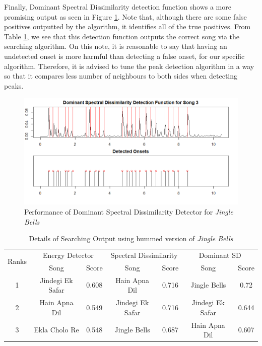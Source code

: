 \documentclass[10pt]{article}
\begin{document}
Finally, Dominant Spectral Dissimilarity detection function shows a more promising output as seen in Figure \ref{fig:dfreq_song3}. Note that, although there are some false positives outputted by the algorithm, it identifies all of the true positives. From Table \ref{tbl:search_song3}, we see that this detection function outputs the correct song via the searching algorithm. On this note, it is reasonable to say that having an undetected onset is more harmful than detecting a false onset, for our specific algorithm. Therefore, it is advised to tune the peak detection algorithm in a way so that it compares less number of neighbours to both sides when detecting peaks.

\begin{figure}
    \centering
    \includegraphics[width = \textwidth]{dfreq_song3.png}
    \caption{Performance of Dominant Spectral Dissimilarity Detector for \textit{Jingle Bells}}
    \label{fig:dfreq_song3}
\end{figure}

\begin{table}
\centering
\caption{Details of Searching Output using hummed version of \textit{Jingle Bells}}
\label{tbl:search_song3}
\begin{tabular}{|c|c|c|c|c|c|c|}
\hline
\multirow{2}{*}{Ranks} & \multicolumn{2}{c|}{Energy Detector} & \multicolumn{2}{c|}{Spectral Dissimilarity} & \multicolumn{2}{c|}{Dominant SD} \\ \cline{2-7} 
    & Song                  & Score        & Song                      & Score           & Song                   & Score     \\ \hline
1   & Jindegi Ek Safar  & 0.608  & Hain Apna Dil & 0.716  &  Jingle Bells    & 0.72     \\ \hline
2       & Hain Apna Dil         & 0.549        & Jindegi Ek Safar             & 0.716           & Jindegi Ek Safar         & 0.644     \\ \hline
3   &   Ekla Cholo Re     & 0.548        & Jingle Bells   & 0.687           & Hain Apna Dil   & 0.607  \\ \hline
\end{tabular}
\end{table}
\end{document}

